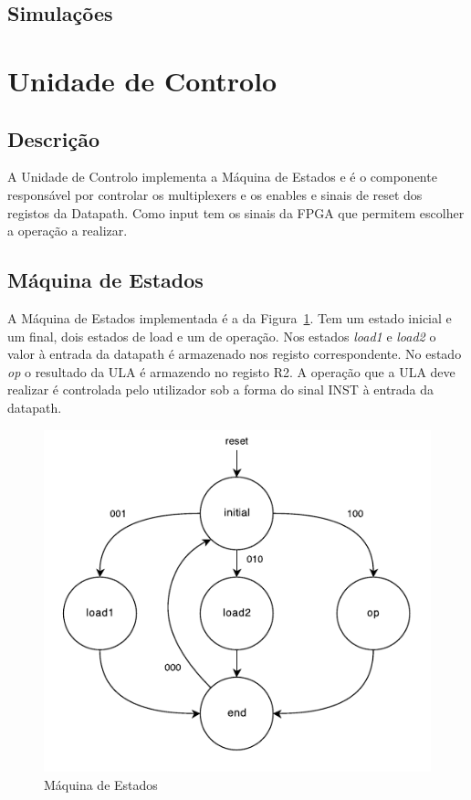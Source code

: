 \documentclass[a4paper]{article}
\begin{document}
\pagebreak
\subsection{Simulações}
\pagebreak


\section{Unidade de Controlo}
\subsection{Descrição}
A Unidade de Controlo implementa a Máquina de Estados e é o componente responsável por controlar os multiplexers e os enables e sinais de reset dos registos da Datapath. Como input tem os sinais da FPGA que permitem escolher a operação a realizar.

\subsection{Máquina de Estados}
A Máquina de Estados implementada é a da Figura~\ref{fig:FSMdiagram}. Tem um estado inicial e um final, dois estados de load e um de operação. Nos estados \textit{load1} e \textit{load2} o valor à entrada da datapath é armazenado nos registo correspondente. No estado \textit{op} o resultado da ULA é armazendo no registo R2. A operação que a ULA deve realizar é controlada pelo utilizador sob a forma do sinal INST à entrada da datapath.

\begin{figure}
	\centering
	\includegraphics[scale=1.2]{FSM}
	\caption{Máquina de Estados}
	\label{fig:FSMdiagram}
\end{figure}
\end{document}
